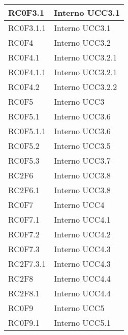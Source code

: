 \begin{center}
\begin{longtable}{|p{5cm}|p{5cm}|}
RC0F3.1		& Interno \newline UCC3.1 \\\hline
RC0F3.1.1	& Interno \newline UCC3.1 \\\hline
RC0F4		& Interno \newline UCC3.2 \\\hline
RC0F4.1		& Interno \newline UCC3.2.1 \\\hline
RC0F4.1.1	& Interno \newline UCC3.2.1 \\\hline
RC0F4.2		& Interno \newline UCC3.2.2 \\\hline
RC0F5		& Interno \newline UCC3 \\\hline
RC0F5.1		& Interno \newline UCC3.6 \\\hline
RC0F5.1.1	& Interno \newline UCC3.6 \\\hline
RC0F5.2		& Interno \newline UCC3.5 \\\hline
RC0F5.3		& Interno \newline UCC3.7 \\\hline
RC2F6		& Interno \newline UCC3.8 \\\hline
RC2F6.1		& Interno \newline UCC3.8 \\\hline
RC0F7		& Interno \newline UCC4 \\\hline
RC0F7.1		& Interno \newline UCC4.1 \\\hline
RC0F7.2		& Interno \newline UCC4.2 \\\hline
RC0F7.3		& Interno \newline UCC4.3 \\\hline
RC2F7.3.1	& Interno \newline UCC4.3 \\\hline
RC2F8		& Interno \newline UCC4.4 \\\hline
RC2F8.1		& Interno \newline UCC4.4 \\\hline
RC0F9		& Interno \newline UCC5 \\\hline
RC0F9.1		& Interno \newline UCC5.1 \\\hline

\end{longtable}
\end{center}

